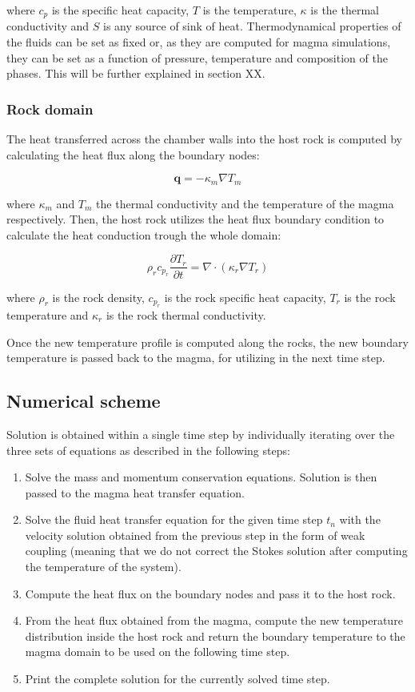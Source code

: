 where $c_p$ is the specific heat capacity, $T$ is the temperature, $\kappa$ is the thermal conductivity and $S$ is any source of sink of heat. Thermodynamical properties of the fluids can be set as fixed or, as they are computed for magma simulations, they can be set as a function of pressure, temperature and composition of the phases. This will be further explained in section XX.

\subsubsection{Rock domain}
The heat transferred across the chamber walls into the host rock is computed by calculating the heat flux along the boundary nodes:

\begin{equation}
	\mathbf{q} = -\kappa_m \nabla T_m
\end{equation}

where $\kappa_m$ and $T_m$ the thermal conductivity and the temperature of the magma respectively. Then, the host rock utilizes the heat flux boundary condition to calculate the heat conduction trough the whole domain:

\begin{equation}
	\rho_r c_{p_r} \frac{\partial T_r}{\partial t} = \nabla \cdot \left( \kappa_r \nabla T_r \right)
\end{equation}

where $\rho_r$ is the rock density, $c_{p_r}$ is the rock specific heat capacity, $T_r$ is the rock temperature and $\kappa_r$ is the rock thermal conductivity.

Once the new temperature profile is computed along the rocks, the new boundary temperature is passed back to the magma, for utilizing in the next time step.

\subsection{Numerical scheme}
Solution is obtained within a single time step by individually iterating over the three sets of equations as described in the following steps:

\begin{enumerate}
	\item Solve the mass and momentum conservation equations. Solution is then passed to the magma heat transfer equation.
	\item Solve the fluid heat transfer equation for the given time step $t_n$ with the velocity solution obtained from the previous step in the form of weak coupling (meaning that we do not correct the Stokes solution after computing the temperature of the system).
	\item Compute the heat flux on the boundary nodes and pass it to the host rock.
	\item From the heat flux obtained from the magma, compute the new temperature distribution inside the host rock and return the boundary temperature to the magma domain to be used on the following time step.
	\item Print the complete solution for the currently solved time step.
\end{enumerate}

